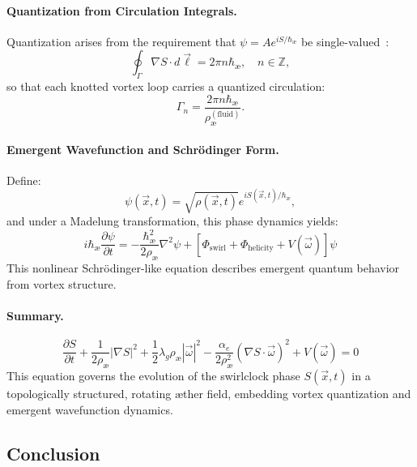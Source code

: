 \documentclass[preprint]{revtex4-2}
\begin{document}
\paragraph{Quantization from Circulation Integrals.}
Quantization arises from the requirement that \( \psi = A e^{i S/\hbar_\text{\ae}} \) be single-valued~\cite{helmholtz1858integrals, faddeev1997stable}:
\begin{equation}
\oint_\Gamma \nabla S \cdot d\vec{\ell} = 2\pi n \hbar_\text{\ae}, \quad n \in \mathbb{Z},
\end{equation}
so that each knotted vortex loop carries a quantized circulation:
\begin{equation}
\Gamma_n = \frac{2\pi n \hbar_\text{\ae}}{\rho_\text{\ae}^{(\text{fluid})}}.
\end{equation}

\paragraph{Emergent Wavefunction and Schrödinger Form.}
Define:
\begin{equation}
\psi(\vec{x}, t) = \sqrt{\rho(\vec{x}, t)} e^{i S(\vec{x}, t)/\hbar_\text{\ae}},
\end{equation}
and under a Madelung transformation, this phase dynamics yields:
\begin{equation}
\boxed{
i \hbar_\text{\ae} \frac{\partial \psi}{\partial t} = -\frac{\hbar_\text{\ae}^2}{2 \rho_\text{\ae}} \nabla^2 \psi + \left[\Phi_\text{swirl} + \Phi_\text{helicity} + V(\vec{\omega})\right] \psi
}
\end{equation}
This nonlinear Schrödinger-like equation describes emergent quantum behavior from vortex structure.

\paragraph{Summary.}
\begin{equation}
\boxed{
\frac{\partial S}{\partial t} + \frac{1}{2 \rho_\text{\ae}} |\nabla S|^2 + \frac{1}{2} \lambda_g \rho_\text{\ae} |\vec{\omega}|^2 - \frac{\alpha_e}{2 \rho_\text{\ae}^2} (\nabla S \cdot \vec{\omega})^2 + V(\vec{\omega}) = 0
}
\end{equation}
This equation governs the evolution of the swirlclock phase \( S(\vec{x}, t) \) in a topologically structured, rotating \ae ther field, embedding vortex quantization and emergent wavefunction dynamics.

\subsection*{Conclusion}
\end{document}
